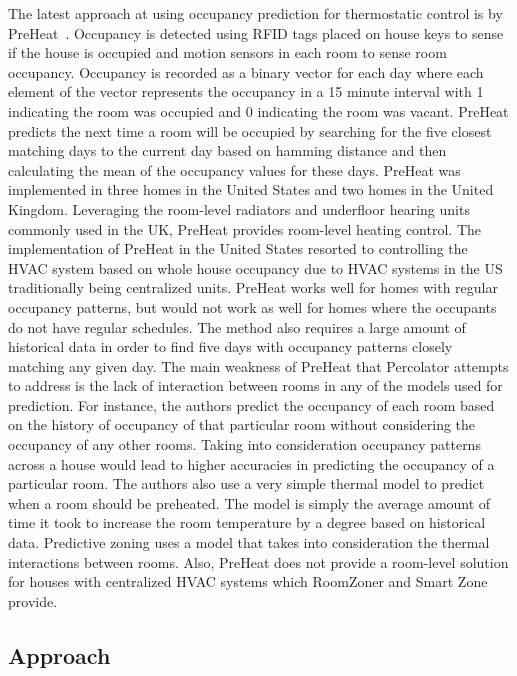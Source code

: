 The latest approach at using occupancy prediction for thermostatic control is by
PreHeat~\cite{scott2011preheat}. Occupancy is detected using RFID tags placed on
house keys to sense if the house is occupied and motion sensors in each room to
sense room occupancy. Occupancy is recorded as a binary vector for each day
where each element of the vector represents the occupancy in a 15 minute
interval with 1 indicating the room was occupied and 0 indicating the room was
vacant. PreHeat predicts the next time a room will be occupied by searching for
the five closest matching days to the current day based on hamming distance and
then calculating the mean of the occupancy values for these days. PreHeat was
implemented in three homes in the United States and two homes in the United
Kingdom. Leveraging the room-level radiators and underfloor hearing units
commonly used in the UK, PreHeat provides room-level heating control. The
implementation of PreHeat in the United States resorted to controlling the HVAC
system based on whole house occupancy due to HVAC systems in the US
traditionally being centralized units. PreHeat works well for homes with regular
occupancy patterns, but would not work as well for homes where the occupants do
not have regular schedules. The method also requires a large amount of
historical data in order to find five days with occupancy patterns closely
matching any given day.  The main weakness of PreHeat that Percolator attempts
to address is the lack of interaction between rooms in any of the models used
for prediction. For instance, the authors predict the occupancy of each room
based on the history of occupancy of that particular room without considering
the occupancy of any other rooms. Taking into consideration occupancy patterns
across a house would lead to higher accuracies in predicting the occupancy of a
particular room. The authors also use a very simple thermal model to predict
when a room should be preheated. The model is simply the average amount of time
it took to increase the room temperature by a degree based on historical
data. Predictive zoning uses a model that takes into consideration the thermal
interactions between rooms. Also, PreHeat does not provide a room-level solution
for houses with centralized HVAC systems which RoomZoner and Smart Zone
provide. 

\subsection{Approach}
\label{sec:occupancyApproach}

